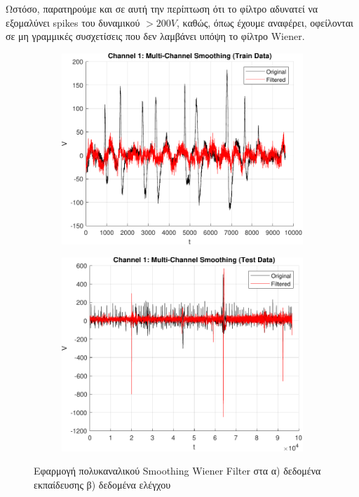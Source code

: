 \documentclass[12pt]{article} %
\begin{document}
Ωστόσο, παρατηρούμε και σε αυτή την περίπτωση ότι το φίλτρο αδυνατεί να εξομαλύνει 
spikes του δυναμικού $ > 200 V$, καθώς, όπως έχουμε αναφέρει,
οφείλονται σε μη γραμμικές συσχετίσεις που δεν λαμβάνει υπόψη το φίλτρο 
Wiener.

\begin{figure}[htbp]
    \centering
    \begin{subfigure}[b]{0.45\textwidth}
        \includegraphics[width=\textwidth]{plot/multi_channel_smoothing_train.pdf}
        \caption{}
        \label{fig:multi_channel_smoothing_train}
    \end{subfigure}
    \hfill
    \begin{subfigure}[b]{0.45\textwidth}
        \includegraphics[width=\textwidth]{plot/multi_channel_smoothing_test.pdf}
        \caption{}
        \label{fig:multi_channel_smoothing_test}
    \end{subfigure}

    \caption{Εφαρμογή πολυκαναλικού Smoothing Wiener Filter 
    στα α) δεδομένα εκπαίδευσης β) δεδομένα ελέγχου}
    \label{fig:multi_channel_smoothing}
\end{figure}
\end{document}
